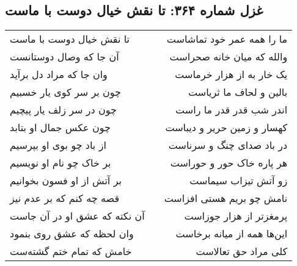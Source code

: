 \begin{center}
\section*{غزل شماره ۳۶۴: تا نقش خیال دوست با ماست}
\label{sec:0364}
\begin{longtable}{l p{0.5cm} r}
تا نقش خیال دوست با ماست
&&
ما را همه عمر خود تماشاست
\\
آن جا که وصال دوستانست
&&
والله که میان خانه صحراست
\\
وان جا که مراد دل برآید
&&
یک خار به از هزار خرماست
\\
چون بر سر کوی یار خسبیم
&&
بالین و لحاف ما ثریاست
\\
چون در سر زلف یار پیچیم
&&
اندر شب قدر قدر ما راست
\\
چون عکس جمال او بتابد
&&
کهسار و زمین حریر و دیباست
\\
از باد چو بوی او بپرسیم
&&
در باد صدای چنگ و سرناست
\\
بر خاک چو نام او نویسیم
&&
هر پاره خاک حور و حوراست
\\
بر آتش از او فسون بخوانیم
&&
زو آتش تیزاب سیماست
\\
قصه چه کنم که بر عدم نیز
&&
نامش چو بریم هستی افزاست
\\
آن نکته که عشق او در آن جاست
&&
پرمغزتر از هزار جوزاست
\\
وان لحظه که عشق روی بنمود
&&
این‌ها همه از میانه برخاست
\\
خامش که تمام ختم گشته‌ست
&&
کلی مراد حق تعالاست
\\
\end{longtable}
\end{center}

